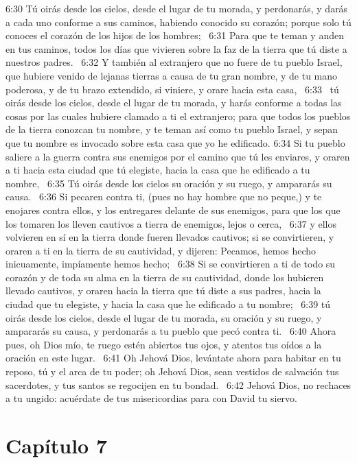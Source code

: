 						6:30 Tú oirás desde los cielos, desde el lugar de tu morada, y perdonarás, y darás a cada uno conforme a sus caminos, habiendo conocido su corazón; porque solo tú conoces el corazón de los hijos de los hombres;  
						6:31 Para que te teman y anden en tus caminos, todos los días que vivieren sobre la faz de la tierra que tú diste a nuestros padres.  
						6:32 Y también al extranjero que no fuere de tu pueblo Israel, que hubiere venido de lejanas tierras a causa de tu gran nombre, y de tu mano poderosa, y de tu brazo extendido, si viniere, y orare hacia esta casa,  
						6:33  tú oirás desde los cielos, desde el lugar de tu morada, y harás conforme a todas las cosas por las cuales hubiere clamado a ti el extranjero; para que todos los pueblos de la tierra conozcan tu nombre, y te teman así como tu pueblo Israel, y sepan que tu nombre es invocado sobre esta casa que yo he edificado. 
						6:34 Si tu pueblo saliere a la guerra contra sus enemigos por el camino que tú les enviares, y oraren a ti hacia esta ciudad que tú elegiste, hacia la casa que he edificado a tu nombre,  
						6:35 Tú oirás desde los cielos su oración y su ruego, y ampararás su causa.  
						6:36 Si pecaren contra ti, (pues no hay hombre que no peque,) y te enojares contra ellos, y los entregares delante de sus enemigos, para que los que los tomaren los lleven cautivos a tierra de enemigos, lejos o cerca,  
						6:37 y ellos volvieren en sí en la tierra donde fueren llevados cautivos; si se convirtieren, y oraren a ti en la tierra de su cautividad, y dijeren: Pecamos, hemos hecho inicuamente, impíamente hemos hecho;  
						6:38 Si se convirtieren a ti de todo su corazón y de toda su alma en la tierra de su cautividad, donde los hubieren llevado cautivos, y oraren hacia la tierra que tú diste a sus padres, hacia la ciudad que tu elegiste, y hacia la casa que he edificado a tu nombre;  
						6:39 tú oirás desde los cielos, desde el lugar de tu morada, su oración y su ruego, y ampararás su causa, y perdonarás a tu pueblo que pecó contra ti.  
						6:40 Ahora pues, oh Dios mío, te ruego estén abiertos tus ojos, y atentos tus oídos a la oración en este lugar.  
						6:41 Oh Jehová Dios, levántate ahora para habitar en tu reposo, tú y el arca de tu poder; oh Jehová Dios, sean vestidos de salvación tus sacerdotes, y tus santos se regocijen en tu bondad.  
						6:42 Jehová Dios, no rechaces a tu ungido: acuérdate de tus misericordias para con David tu siervo. 
						\section*{Capítulo 7}
							
